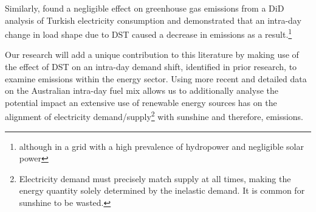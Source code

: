 Similarly, \textcite{turkey} found a negligible effect on greenhouse gas emissions from a \ac{DiD} analysis of Turkish electricity consumption and demonstrated that an intra-day change in load shape due to \ac{DST} caused a decrease in emissions as a result.\footnote{although in a grid with a high prevalence of hydropower and negligible solar power}

Our research will add a unique contribution to this literature by making use of the effect of \ac{DST} on an intra-day demand shift, identified in prior research, to examine emissions within the energy sector. Using more recent and detailed data on the Australian intra-day fuel mix allows us to additionally analyse the potential impact an extensive use of renewable energy sources has on the alignment of electricity demand/supply\footnote{Electricity demand must precisely match supply at all times, making the energy quantity solely determined by the inelastic demand. It is common for sunshine to be wasted.} with sunshine and therefore, emissions.

